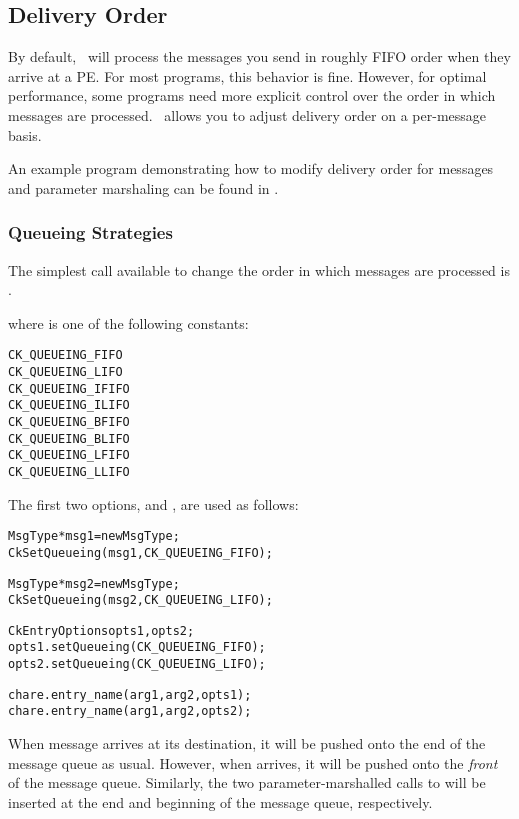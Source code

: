 \subsection{Delivery Order}

By default, \charmpp\ will process the messages you send in roughly
FIFO order when they arrive at a PE.
For most programs, this behavior is fine.  However, for optimal
performance, some programs need more explicit control over the order
in which messages are processed. \charmpp\ allows you to adjust
delivery order on a per-message basis.


An example program demonstrating how to modify delivery order for messages and
parameter marshaling can be found in .

\subsubsection{Queueing Strategies}
\label{queueing strategies}

The simplest call available to change the order in which messages
are processed is .


where  is one of the following constants:

\begin{alltt}
  CK_QUEUEING_FIFO
  CK_QUEUEING_LIFO
  CK_QUEUEING_IFIFO
  CK_QUEUEING_ILIFO
  CK_QUEUEING_BFIFO
  CK_QUEUEING_BLIFO
  CK_QUEUEING_LFIFO
  CK_QUEUEING_LLIFO
\end{alltt}

The first two options,   and
, are used as follows:

\begin{alltt}
  MsgType *msg1 = new MsgType ;
  CkSetQueueing(msg1, CK_QUEUEING_FIFO);

  MsgType *msg2 = new MsgType ;
  CkSetQueueing(msg2, CK_QUEUEING_LIFO);

  CkEntryOptions opts1, opts2;
  opts1.setQueueing(CK_QUEUEING_FIFO);
  opts2.setQueueing(CK_QUEUEING_LIFO);

  chare.entry_name(arg1, arg2, opts1);
  chare.entry_name(arg1, arg2, opts2);
\end{alltt}

When message  arrives at its destination, it will be pushed
onto the end of the message queue as usual.  However, when 
arrives, it will be pushed onto the {\em front} of the message
queue. Similarly, the two parameter-marshalled calls to 
will be inserted at the end and beginning of the message queue,
respectively.

